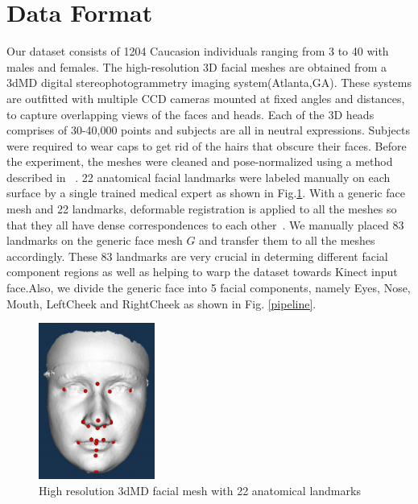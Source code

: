 \documentclass[annual]{acmsiggraph}
\begin{document}
\section{Data Format}

Our dataset consists of 1204 Caucasion individuals ranging from 3 to 40 with males and females. The high-resolution 3D facial meshes are obtained from a 3dMD digital stereophotogrammetry imaging system(Atlanta,GA). These systems are outfitted with multiple CCD cameras mounted at fixed angles and distances, to capture overlapping views of the faces and heads. Each of the 3D heads comprises of 30-40,000 points and subjects are all in neutral expressions. Subjects were required to wear caps to get rid of the hairs that obscure their faces. Before the experiment, the meshes were cleaned and pose-normalized using a method described in ~\cite{wilamowska2009classification}. 22 anatomical facial landmarks were labeled manually on each surface by a single trained medical expert as shown in Fig.\ref{dataset}. With a generic face mesh and 22 landmarks, deformable registration is applied to all the meshes so that they all have dense correspondences to each other~\cite{allen}. We manually placed 83 landmarks on the generic face mesh $G$ and transfer them to all the meshes accordingly.  These 83 landmarks are very crucial in determing different facial component regions as well as helping to warp the dataset towards Kinect input face.Also, we divide the generic face into 5 facial components, namely Eyes, Nose, Mouth, LeftCheek and RightCheek as shown in Fig. \ref{pipeline}. 

\begin{figure}[ht]
  \centering
  \includegraphics[width=1.5in]{images/dataformat}
  \caption{High resolution 3dMD facial mesh with 22 anatomical landmarks}\label{dataset}
\end{figure}
\end{document}
